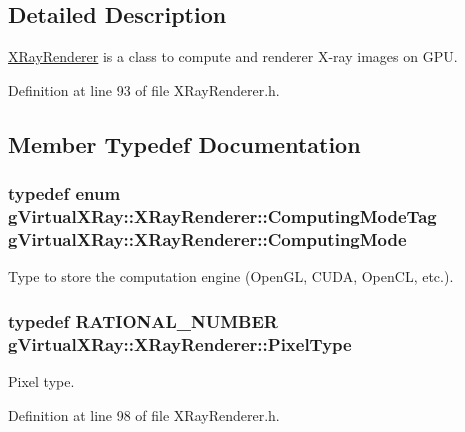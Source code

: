 \subsection{Detailed Description}
\hyperlink{classg_virtual_x_ray_1_1_x_ray_renderer}{XRayRenderer} is a class to compute and renderer X-\/ray images on GPU. 

Definition at line 93 of file XRayRenderer.h.



\subsection{Member Typedef Documentation}
\hypertarget{classg_virtual_x_ray_1_1_x_ray_renderer_af306d3bab294f730af5a692f716c9f81}{
\subsubsection[{ComputingMode}]{\setlength{\rightskip}{0pt plus 5cm}typedef enum {\bf gVirtualXRay::XRayRenderer::ComputingModeTag}  {\bf gVirtualXRay::XRayRenderer::ComputingMode}}}
\label{classg_virtual_x_ray_1_1_x_ray_renderer_af306d3bab294f730af5a692f716c9f81}


Type to store the computation engine (OpenGL, CUDA, OpenCL, etc.). 

\hypertarget{classg_virtual_x_ray_1_1_x_ray_renderer_a1337efbad4ecdc7ea0054b187590596d}{
\subsubsection[{PixelType}]{\setlength{\rightskip}{0pt plus 5cm}typedef {\bf RATIONAL\_\-NUMBER} {\bf gVirtualXRay::XRayRenderer::PixelType}}}
\label{classg_virtual_x_ray_1_1_x_ray_renderer_a1337efbad4ecdc7ea0054b187590596d}


Pixel type. 



Definition at line 98 of file XRayRenderer.h.



